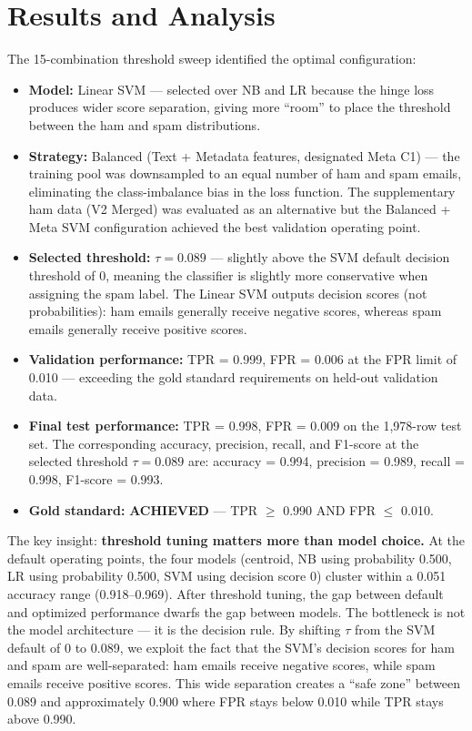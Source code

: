\section{Results and Analysis}

\begin{resultbox}
The 15-combination threshold sweep identified the optimal configuration:
\begin{itemize}
  \item \textbf{Model:} Linear SVM — selected over NB and LR because the hinge loss produces wider score separation, giving more ``room'' to place the threshold between the ham and spam distributions.
  \item \textbf{Strategy:} Balanced (Text + Metadata features, designated Meta C1) — the training pool was downsampled to an equal number of ham and spam emails, eliminating the class-imbalance bias in the loss function. The supplementary ham data (V2 Merged) was evaluated as an alternative but the Balanced + Meta SVM configuration achieved the best validation operating point.
  \item \textbf{Selected threshold:} $\tau = 0.089$ — slightly above the SVM default decision threshold of 0, meaning the classifier is slightly more conservative when assigning the spam label. The Linear SVM outputs decision scores (not probabilities): ham emails generally receive negative scores, whereas spam emails generally receive positive scores.
  \item \textbf{Validation performance:} TPR = 0.999, FPR = 0.006 at the FPR limit of 0.010 — exceeding the gold standard requirements on held-out validation data.
  \item \textbf{Final test performance:} TPR = 0.998, FPR = 0.009 on the 1,978-row test set. The corresponding accuracy, precision, recall, and F1-score at the selected threshold $\tau = 0.089$ are: accuracy = 0.994, precision = 0.989, recall = 0.998, F1-score = 0.993.
  \item \textbf{Gold standard:} \textbf{ACHIEVED} — TPR $\ge$ 0.990 AND FPR $\le$ 0.010.
\end{itemize}

The key insight: \textbf{threshold tuning matters more than model choice.} At the default operating points, the four models (centroid, NB using probability 0.500, LR using probability 0.500, SVM using decision score 0) cluster within a 0.051 accuracy range (0.918--0.969). After threshold tuning, the gap between default and optimized performance dwarfs the gap between models. The bottleneck is not the model architecture — it is the decision rule. By shifting $\tau$ from the SVM default of 0 to 0.089, we exploit the fact that the SVM's decision scores for ham and spam are well-separated: ham emails receive negative scores, while spam emails receive positive scores. This wide separation creates a ``safe zone'' between 0.089 and approximately 0.900 where FPR stays below 0.010 while TPR stays above 0.990.
\end{resultbox}

